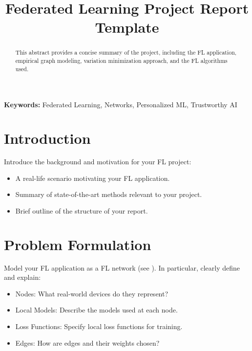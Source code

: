 \documentclass[9pt]{article}
\title{Federated Learning Project Report Template}
\begin{document}
	\maketitle
	
	\begin{abstract}
		This abstract provides a concise summary of the project, including the FL application, empirical graph modeling, variation minimization approach, and the FL algorithms used.
	\end{abstract}
	
	\textbf{Keywords:} Federated Learning, Networks, Personalized ML, Trustworthy AI
	
	\section{Introduction}
	\label{sec:intro}
	\begin{tcolorbox}[colback=gray!10, colframe=black!50, title=Instructions (Remove before submission)]
		Introduce the background and motivation for your FL project:
		\begin{itemize}
			\item A real-life scenario motivating your FL application.
			\item Summary of state-of-the-art methods relevant to your project.
			\item Brief outline of the structure of your report.
		\end{itemize}
	\end{tcolorbox}
	
	\section{Problem Formulation}
	\label{sec:pf}
	\begin{tcolorbox}[colback=gray!10, colframe=black!50, title=Instructions (Remove before submission)]
		Model your FL application as a FL network (see \cite[Ch.~3]{Jung2025}). 
		In particular, clearly define and explain:
		\begin{itemize}
			\item Nodes: What real-world devices do they represent?
			\item Local Models: Describe the models used at each node.
			\item Loss Functions: Specify local loss functions for training.
			\item Edges: How are edges and their weights chosen?
		\end{itemize}
	\end{tcolorbox}
	
\end{document}
